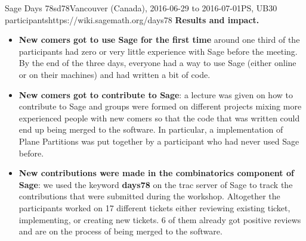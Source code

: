 \begin{event}{Sage Days 78}{sd78}{Vancouver (Canada), 2016-06-29 to 2016-07-01}{PS, UB}{30 participants}{https://wiki.sagemath.org/days78}
\textbf{Results and impact.} 
\begin{itemize}
\item \textbf{New comers got to use Sage for the first time} around one
third of the participants had zero or very little experience with Sage before the meeting. By the
end of the three days, everyone had a way to use Sage (either online or on their machines)
and had written a bit of code.
\item \textbf{New comers got to contribute to Sage}: a lecture was given on how to contribute to Sage
and groups were formed on different projects mixing more experienced people with new comers so
that the code that was written could end up being merged to the software. In particular, a implementation
of Plane Partitions was put together by a participant who had never used Sage before.
\item \textbf{New contributions were made in the combinatorics component of Sage}: we used the keyword
\textbf{days78} on the trac server of Sage to track the contributions that were submitted during the workshop.
 Altogether the participants
worked on 17 different tickets either reviewing
existing ticket, implementing, or creating new tickets. 6 of them already got positive reviews and are
on the process of being merged to the software.
\end{itemize}


\end{event}

